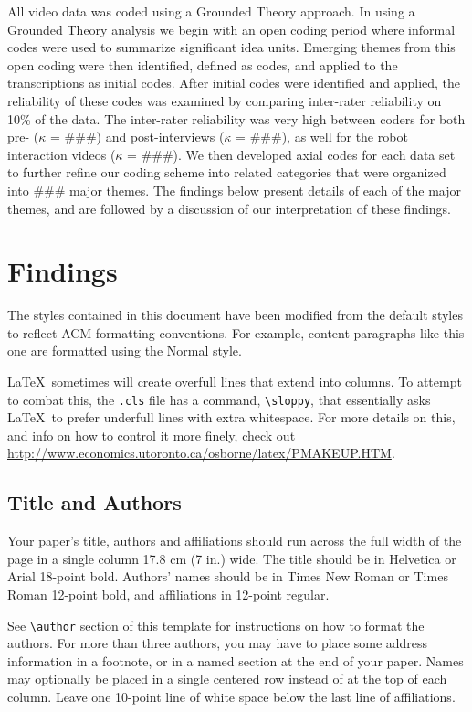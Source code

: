 \documentclass{sigchi}
\begin{document}
  All video data was coded using a Grounded Theory \cite{Glaser:1967,Charmaz:2012}approach. In using a Grounded Theory analysis we begin with an open coding period where informal codes were used to summarize significant idea units.  Emerging themes from this open coding were then identified, defined as codes, and applied to the transcriptions as initial codes. After initial codes were identified and applied, the reliability of these codes was examined by comparing inter-rater reliability on 10\% of the data. The inter-rater reliability was very high between coders for both pre- ($\kappa$ = \#\#\#) and post-interviews ($\kappa$ = \#\#\#), as well for the robot interaction videos ($\kappa$ = \#\#\#). We then developed axial codes for each data set to further refine our coding scheme into related categories that were organized into \#\#\# major themes. The findings below present details of each of the major themes, and are followed by a discussion of our interpretation of these findings.
 
\section{Findings}
The styles contained in this document have been modified from the
default styles to reflect ACM formatting conventions. For example,
content paragraphs like this one are formatted using the Normal style.

\LaTeX\ sometimes will create overfull lines that extend into columns.
To attempt to combat this, the \texttt{.cls} file has a command,
\texttt{{\textbackslash}sloppy}, that essentially asks \LaTeX\ to
prefer underfull lines with extra whitespace.  For more details on
this, and info on how to control it more finely, check out
{\url{http://www.economics.utoronto.ca/osborne/latex/PMAKEUP.HTM}}.


\subsection{Title and Authors}

Your paper's title, authors and affiliations should run across the
full width of the page in a single column 17.8 cm (7 in.) wide.  The
title should be in Helvetica or Arial 18-point bold.  Authors' names
should be in Times New Roman or Times Roman 12-point bold, and
affiliations in 12-point regular.  

See \texttt{{\textbackslash}author} section of this template for
instructions on how to format the authors. For more than three
authors, you may have to place some address information in a footnote,
or in a named section at the end of your paper. Names may optionally
be placed in a single centered row instead of at the top of each
column. Leave one 10-point line of white space below the last line of
affiliations.
\end{document}
